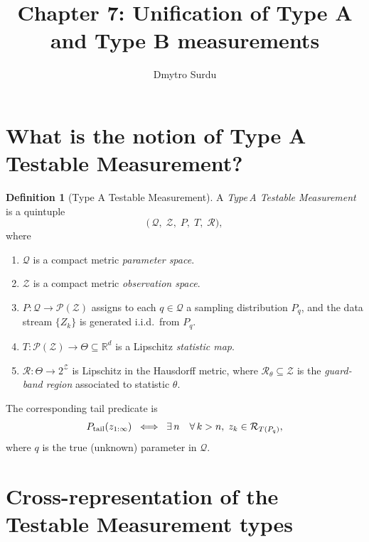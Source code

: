 \documentclass[12pt]{article}
\title{\textbf{Chapter 7: Unification of Type A and Type B measurements}}
\author{Dmytro Surdu}
\date{}
\theoremstyle{definition}
\newtheorem{definition}{Definition}[section]
\theoremstyle{plain}
\begin{document}
\maketitle


\section{What is the notion of Type A Testable Measurement?}
\begin{definition}[Type A Testable Measurement]
A \emph{Type\,A Testable Measurement} is a quintuple
\[
  \bigl(\,
    \mathcal Q,\;
    \mathcal Z,\;
    P,\;
    T,\;
    \mathcal R
  \bigr),
\]
where
\begin{enumerate}
  \item \(\mathcal Q\) is a compact metric \emph{parameter space}.
  \item \(\mathcal Z\) is a compact metric \emph{observation space}.
  \item \(P\colon \mathcal Q \to \mathcal P(\mathcal Z)\) assigns to each \(q\in\mathcal Q\) a sampling distribution \(P_q\), and the data stream \(\{Z_k\}\) is generated i.i.d.\ from \(P_q\).
  \item \(T\colon \mathcal P(\mathcal Z)\to \Theta\subseteq \mathbb R^d\) is a Lipschitz \emph{statistic map}.
  \item \(\mathcal R\colon \Theta\to 2^{\mathcal Z}\) is Lipschitz in the Hausdorff metric, where \(\mathcal R_\theta\subseteq\mathcal Z\) is the \emph{guard‐band region} associated to statistic \(\theta\).
\end{enumerate}
The corresponding tail predicate is
\[
  P_{\rm tail}(z_{1:\infty}) 
  \;\iff\;
  \exists\,n\quad\forall\,k>n,\;
    z_k \in \mathcal R_{T(P_q)},
\]
where \(q\) is the true (unknown) parameter in \(\mathcal Q\).
\end{definition}

\section{Cross-representation of the Testable Measurement types}
\end{document}
